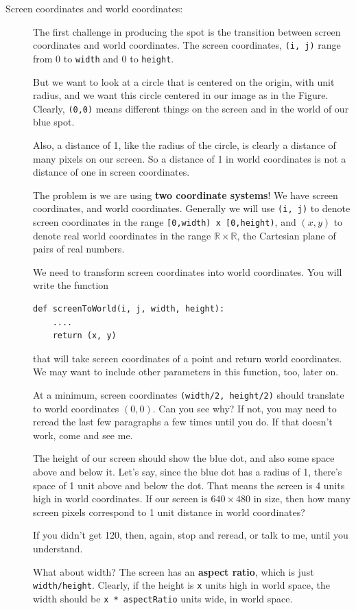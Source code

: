 \documentclass[12pt]{article}
\begin{document}
\begin{description}
\item[Screen coordinates and world coordinates:]
The first challenge in producing the spot
is the transition between screen coordinates
and world coordinates.  The screen coordinates,
\lstinline{(i, j)} range from 0 to \lstinline{width}
and 0 to \lstinline{height}.

But we want to look at a circle that is centered
on the origin, with unit radius, and we want this
circle centered in our image as in the Figure.
Clearly, \lstinline{(0,0)} means different things
on the screen and in the world of our blue spot.

Also, a distance of 1, like the radius of the circle,
is clearly a distance of many pixels on our screen.
So a distance of 1 in world coordinates is not a distance
of one in screen coordinates.

The problem is we are using {\bf two coordinate systems}!
We have screen coordinates, and world coordinates.
Generally we will use \lstinline{(i, j)} to denote
screen coordinates in the range 
\lstinline{[0,width) x [0,height)},
and $(x,y)$ to denote real world coordinates
in the range $\mathbb{R} \times \mathbb{R}$,
the Cartesian plane of pairs of real numbers.

We need to transform screen coordinates into world
coordinates.  You will write the function
\begin{lstlisting}
def screenToWorld(i, j, width, height):
    ....
    return (x, y)
\end{lstlisting}
that will take screen coordinates of a point
and return world coordinates.  We may want
to include other parameters in this function, too,
later on.

At a minimum, screen coordinates 
\lstinline{(width/2, height/2)} should translate
to world coordinates $(0,0)$.  Can you see why?
If not, you may need to reread the last few paragraphs
a few times until you do.  If that doesn't work,
come and see me.

The height of our screen should show the blue dot,
and also some space above and below it.  Let's say,
since the blue dot has a radius of 1, there's space
of 1 unit above and below the dot.  That means
the screen is 4 units high in world coordinates.
If our screen is $640 \times 480$ in size, then
how many screen pixels correspond to 1 
unit distance in world coordinates?  

If you didn't get 120, then, again, stop
and reread, or talk to me, until you understand.

What about width?  The screen has an {\bf aspect ratio},
which is just \lstinline{width/height}.  Clearly,
if the height is \lstinline{x} units high in world
space, the width should
be \lstinline{x * aspectRatio} units wide, in world space.


\end{description}
\end{document}
